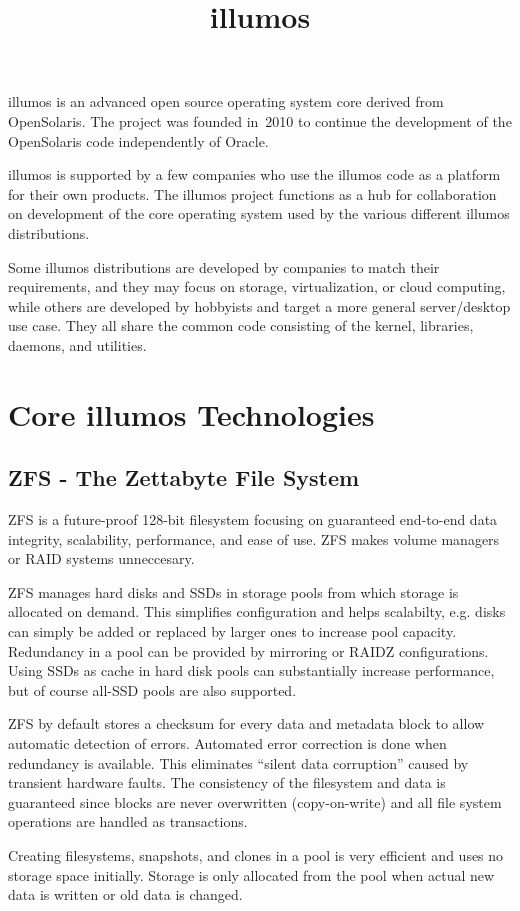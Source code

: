\documentclass[11pt,foldmark,notumble]{leaflet}
\title{\bf illumos}
\begin{document}
\vspace*{4cm}
illumos is an advanced open source operating system core derived from
OpenSolaris. The project was founded in~2010 to continue the
development of the OpenSolaris code independently of Oracle.

illumos is supported by a few companies who use the illumos code
as a platform for their own products. The illumos project functions as
a hub for collaboration on development of the core operating system
used by the various different illumos distributions.

Some illumos distributions are developed by companies to match their
requirements, and they may focus on storage, virtualization, or cloud
computing, while others are developed by hobbyists and target a more
general server/desktop use case. They all share the common code
consisting of the kernel, libraries, daemons, and utilities.


\section{Core illumos Technologies}
\subsection{ZFS - The Zettabyte File System}
ZFS is a future-proof 128-bit filesystem focusing on guaranteed
end-to-end data integrity, scalability, performance, and ease of use.
ZFS makes volume managers or RAID systems unneccesary.

ZFS manages hard disks and SSDs in storage pools from which storage is
allocated on demand. This simplifies configuration and helps
scalabilty, e.g. disks can simply be added or replaced by larger ones
to increase pool capacity. Redundancy in a pool can be provided by
mirroring or RAIDZ configurations. Using SSDs as cache in hard disk
pools can substantially increase performance, but of course all-SSD
pools are also supported.

ZFS by default stores a checksum for every data and metadata block to
allow automatic detection of errors. Automated error correction is
done when redundancy is available. This eliminates ``silent data
corruption'' caused by transient hardware faults. The consistency of
the filesystem and data is guaranteed since blocks are never
overwritten (copy-on-write) and all file system operations are handled
as transactions.

Creating filesystems, snapshots, and clones in a pool is very
efficient and uses no storage space initially. Storage is only
allocated from the pool when actual new data is written or old data is
changed.
\end{document}
